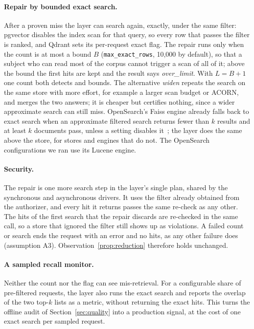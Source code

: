 \paragraph{Repair by bounded exact search.}
After a proven miss the layer can search again, exactly, under the same filter: pgvector disables the
index scan for that query, so every row that passes the filter is ranked, and Qdrant sets its
per-request exact flag. The repair runs only when the count is at most a bound $B$
(\texttt{max\_exact\_rows}, 10,000 by default), so that a subject who can read most of the corpus
cannot trigger a scan of all of it; above the bound the first hits are kept and the result says
\emph{over\_limit}. With $L = B + 1$ one count both detects and bounds. The alternative
\emph{widen} repeats the search on the same store with more effort, for example a larger scan budget
or ACORN, and merges the two answers; it is cheaper but certifies nothing, since a wider approximate
search can still miss. OpenSearch's Faiss engine already falls back to exact search when an
approximate filtered search returns fewer than $k$ results and at least $k$ documents pass, unless a setting disables it~\cite{opensearch2026efficient}; the layer
does the same above the store, for stores and engines that do not. The OpenSearch configurations we ran use its Lucene engine.

\paragraph{Security.}
The repair is one more search step in the layer's single plan, shared by the synchronous and
asynchronous drivers. It uses the filter already obtained from the authorizer, and every hit it
returns passes the same re-check as any other. The hits of the first search that the repair
discards are re-checked in the same call, so a store that ignored the filter still shows up as
violations. A failed count or search ends the request with an error and no hits, as any other
failure does (assumption A3). Observation~\ref{prop:reduction} therefore holds unchanged.

\paragraph{A sampled recall monitor.}
Neither the count nor the flag can see mis-retrieval. For a configurable share of pre-filtered
requests, the layer also runs the exact search and reports the overlap of the two top-$k$ lists as a
metric, without returning the exact hits. This turns the offline audit of Section~\ref{sec:quality}
into a production signal, at the cost of one exact search per sampled request.

